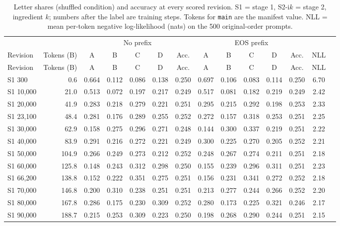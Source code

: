 \begin{longtable}{lrcccccccccccc}
\caption{Letter shares (shuffled condition) and accuracy at every scored revision. S1 = stage 1, S2-i$k$ = stage 2, ingredient $k$; numbers after the label are training steps. Tokens for \texttt{main} are the manifest value. NLL = mean per-token negative log-likelihood (nats) on the 500 original-order prompts.}\label{tab:allrevs}\\
\toprule
 & & \multicolumn{5}{c}{No prefix} & \multicolumn{5}{c}{EOS prefix} & \\
\cmidrule(lr){3-7}\cmidrule(lr){8-12}
Revision & Tokens (B) & A & B & C & D & Acc. & A & B & C & D & Acc. & NLL \\
\midrule
\endfirsthead
\toprule Revision & Tokens (B) & A & B & C & D & Acc. & A & B & C & D & Acc. & NLL \\ \midrule
\endhead
\bottomrule
\endlastfoot
S1 300 & 0.6 & 0.664 & 0.112 & 0.086 & 0.138 & 0.250 & 0.697 & 0.106 & 0.083 & 0.114 & 0.250 & 6.70 \\
S1 10,000 & 21.0 & 0.513 & 0.072 & 0.197 & 0.217 & 0.249 & 0.517 & 0.081 & 0.182 & 0.219 & 0.249 & 2.42 \\
S1 20,000 & 41.9 & 0.283 & 0.218 & 0.279 & 0.221 & 0.251 & 0.295 & 0.215 & 0.292 & 0.198 & 0.253 & 2.33 \\
S1 23,100 & 48.4 & 0.281 & 0.176 & 0.289 & 0.255 & 0.252 & 0.272 & 0.157 & 0.318 & 0.253 & 0.251 & 2.25 \\
S1 30,000 & 62.9 & 0.158 & 0.275 & 0.296 & 0.271 & 0.248 & 0.144 & 0.300 & 0.337 & 0.219 & 0.251 & 2.22 \\
S1 40,000 & 83.9 & 0.291 & 0.216 & 0.272 & 0.221 & 0.249 & 0.300 & 0.225 & 0.270 & 0.205 & 0.252 & 2.21 \\
S1 50,000 & 104.9 & 0.266 & 0.249 & 0.273 & 0.212 & 0.252 & 0.248 & 0.267 & 0.274 & 0.211 & 0.251 & 2.18 \\
S1 60,000 & 125.8 & 0.148 & 0.243 & 0.312 & 0.298 & 0.250 & 0.155 & 0.239 & 0.296 & 0.311 & 0.251 & 2.23 \\
S1 66,200 & 138.8 & 0.152 & 0.222 & 0.351 & 0.275 & 0.251 & 0.156 & 0.231 & 0.341 & 0.272 & 0.252 & 2.18 \\
S1 70,000 & 146.8 & 0.200 & 0.310 & 0.238 & 0.251 & 0.251 & 0.213 & 0.277 & 0.244 & 0.266 & 0.252 & 2.20 \\
S1 80,000 & 167.8 & 0.286 & 0.175 & 0.230 & 0.309 & 0.252 & 0.280 & 0.173 & 0.225 & 0.321 & 0.246 & 2.17 \\
S1 90,000 & 188.7 & 0.215 & 0.253 & 0.309 & 0.223 & 0.250 & 0.198 & 0.268 & 0.290 & 0.244 & 0.251 & 2.15 \\

\end{longtable}
